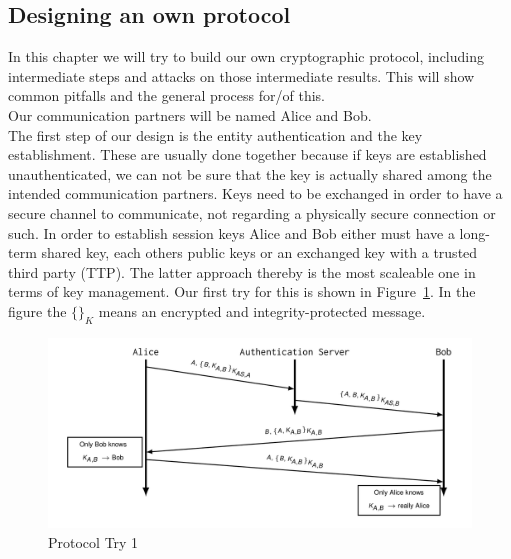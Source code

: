 \subsection{Designing an own protocol}
In this chapter we will try to build our own cryptographic protocol, including intermediate steps and attacks on those intermediate results.
This will show common pitfalls and the general process for/of this.\\
Our communication partners will be named Alice and Bob.\\

The first step of our design is the entity authentication and the key establishment.
These are usually done together because if keys are established unauthenticated, we can not be sure that the key is actually shared among the intended communication partners.
Keys need to be exchanged in order to have a secure channel to communicate, not regarding a physically secure connection or such.
In order to establish session keys Alice and Bob either must have a long-term shared key, each others public keys or an exchanged key with a trusted third party (TTP).
The latter approach thereby is the most scaleable one in terms of key management.
Our first try for this is shown in Figure~\ref{fig:ooppt1}.
In the figure the $\{\}_K$ means an encrypted and integrity-protected message.\\
\begin{figure}[h]
  \centering
  \includegraphics[width=.8\textwidth]{figures/ooppt1.png}
  \caption{Protocol Try 1}\label{fig:ooppt1}
\end{figure}
\newpage


